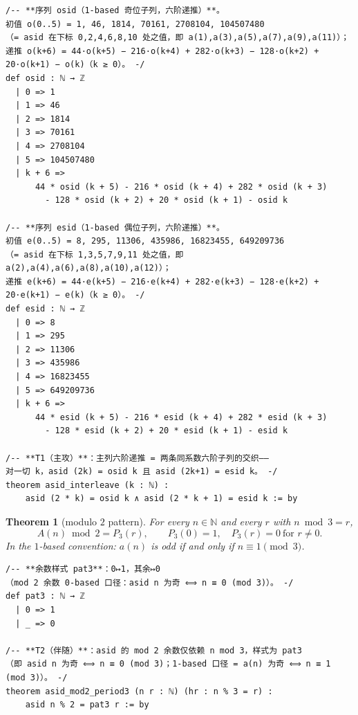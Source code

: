 \documentclass[11pt]{article}
\newtheorem{theorem}{Theorem}
\theoremstyle{definition}
\begin{document}
\begin{lstlisting}[caption={Sequences \texttt{osid}, \texttt{esid} and the statement of Theorem~\ref{thm:interleave}, verbatim from the frozen statement file (lines 41--74, sha256 \texttt{5fe889d5}). The \texttt{:= by} at the end of the theorem line opens the proof body, which is given in Listing~\ref{lst:proof-t1}; the \texttt{sorry} placeholder of the frozen file is not part of the excerpt.},label={lst:stmt-t1}]
/-- **序列 osid（1-based 奇位子列，六阶递推）**。
初值 o(0..5) = 1, 46, 1814, 70161, 2708104, 104507480
（= asid 在下标 0,2,4,6,8,10 处之值，即 a(1),a(3),a(5),a(7),a(9),a(11)）；
递推 o(k+6) = 44·o(k+5) − 216·o(k+4) + 282·o(k+3) − 128·o(k+2) + 20·o(k+1) − o(k)（k ≥ 0）。 -/
def osid : ℕ → ℤ
  | 0 => 1
  | 1 => 46
  | 2 => 1814
  | 3 => 70161
  | 4 => 2708104
  | 5 => 104507480
  | k + 6 =>
      44 * osid (k + 5) - 216 * osid (k + 4) + 282 * osid (k + 3)
        - 128 * osid (k + 2) + 20 * osid (k + 1) - osid k

/-- **序列 esid（1-based 偶位子列，六阶递推）**。
初值 e(0..5) = 8, 295, 11306, 435986, 16823455, 649209736
（= asid 在下标 1,3,5,7,9,11 处之值，即 a(2),a(4),a(6),a(8),a(10),a(12)）；
递推 e(k+6) = 44·e(k+5) − 216·e(k+4) + 282·e(k+3) − 128·e(k+2) + 20·e(k+1) − e(k)（k ≥ 0）。 -/
def esid : ℕ → ℤ
  | 0 => 8
  | 1 => 295
  | 2 => 11306
  | 3 => 435986
  | 4 => 16823455
  | 5 => 649209736
  | k + 6 =>
      44 * esid (k + 5) - 216 * esid (k + 4) + 282 * esid (k + 3)
        - 128 * esid (k + 2) + 20 * esid (k + 1) - esid k

/-- **T1（主攻）**：主列六阶递推 = 两条同系数六阶子列的交织——
对一切 k，asid (2k) = osid k 且 asid (2k+1) = esid k。 -/
theorem asid_interleave (k : ℕ) :
    asid (2 * k) = osid k ∧ asid (2 * k + 1) = esid k := by
\end{lstlisting}

\begin{theorem}[modulo $2$ pattern]\label{thm:mod2}
For every $n\in\mathbb{N}$ and every $r$ with $n\bmod 3=r$,
\[
  A(n)\bmod 2=P_3(r),\qquad P_3(0)=1,\quad P_3(r)=0\ \text{for }r\neq 0.
\]
In the $1$-based convention: $a(n)$ is odd if and only if $n\equiv
1\pmod 3$.
\end{theorem}

\begin{lstlisting}[caption={Pattern \texttt{pat3} and the statement of Theorem~\ref{thm:mod2}, verbatim from the frozen statement file (lines 77--86, sha256 \texttt{5fe889d5}).},label={lst:stmt-t2}]
/-- **余数样式 pat3**：0↦1，其余↦0
（mod 2 余数 0-based 口径：asid n 为奇 ⟺ n ≡ 0 (mod 3)）。 -/
def pat3 : ℕ → ℤ
  | 0 => 1
  | _ => 0

/-- **T2（伴随）**：asid 的 mod 2 余数仅依赖 n mod 3，样式为 pat3
（即 asid n 为奇 ⟺ n ≡ 0 (mod 3)；1-based 口径 = a(n) 为奇 ⟺ n ≡ 1 (mod 3)）。 -/
theorem asid_mod2_period3 (n r : ℕ) (hr : n % 3 = r) :
    asid n % 2 = pat3 r := by
\end{lstlisting}
\end{document}
